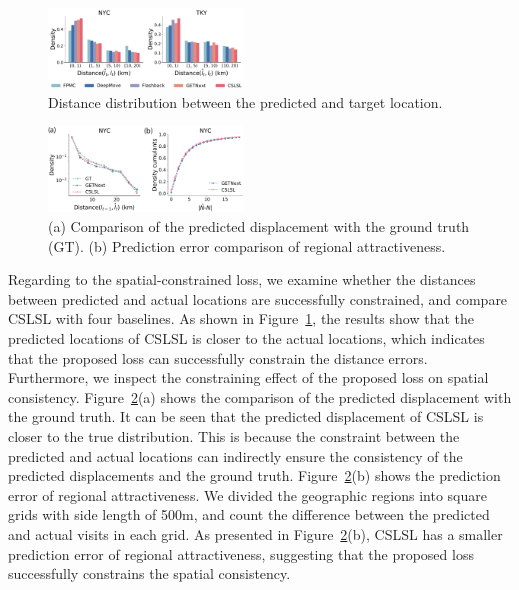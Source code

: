 \documentclass[sigconf]{acmart}
\begin{document}
    \begin{figure}[bt]
        \begin{center}
        \includegraphics[width=0.46\textwidth]{figure/analysis_distPT.pdf}
        \end{center}
        \caption{Distance distribution between the predicted and target location.}
        \label{fig:distPT}
    \end{figure}

	\begin{figure}[bt]
        \begin{center}
        \includegraphics[width=0.46\textwidth]{figure/analysis_ab.pdf}
        \end{center}
        \caption{(a) Comparison of the predicted displacement with the ground truth (GT). (b) Prediction error comparison of regional attractiveness.}
        \label{fig:ab}
    \end{figure}


    Regarding to the spatial-constrained loss, we examine whether the distances between predicted and actual locations are successfully constrained, and compare CSLSL with four baselines. As shown in Figure~\ref{fig:distPT}, the results show that the predicted locations of CSLSL is closer to the actual locations, which indicates that the proposed loss can successfully constrain the distance errors. 
    Furthermore, we inspect the constraining effect of the proposed loss on spatial consistency. Figure~\ref{fig:ab}(a) shows the comparison of the predicted displacement with the ground truth. It can be seen that the predicted displacement of CSLSL is closer to the true distribution. This is because the constraint between the predicted and actual locations can indirectly ensure the consistency of the predicted displacements and the ground truth. 
    Figure~\ref{fig:ab}(b) shows the prediction error of regional attractiveness. We divided the geographic regions into square grids with side length of 500m, and count the difference between the predicted and actual visits in each grid. As presented in Figure~\ref{fig:ab}(b), CSLSL has a smaller prediction error of regional attractiveness, suggesting that the proposed loss successfully constrains the spatial consistency.
\end{document}
